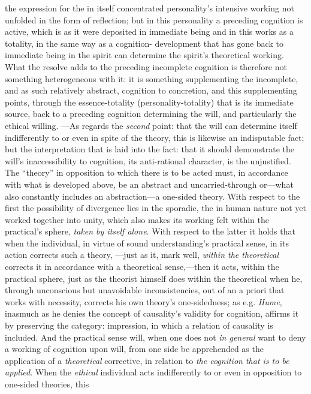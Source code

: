\documentclass[12pt,a4paper]{book}
\begin{document}
the expression for the in itself concentrated personality's intensive working not unfolded in the
form of reflection; but in this personality a preceding cognition is active, which is as it were
deposited in immediate being and in this works as a totality, in the same way as a cognition-
development that has gone back to immediate being in the spirit can determine the spirit's
theoretical working. What the resolve adds to the preceding incomplete cognition is therefore not
something heterogeneous with it: it is something supplementing the incomplete, and as such relatively
abstract, cognition to concretion, and this supplementing points, through the essence-totality
(personality-totality) that is its immediate source, back to a preceding cognition determining the
will, and particularly the ethical willing. ---As regards the \emph{second} point: that the will can
determine itself indifferently to or even in spite of the theory, this is likewise an indisputable
fact; but the interpretation that is laid into the fact: that it should demonstrate the will's
inaccessibility to cognition, its anti-rational character, is the unjustified. The ``theory'' in
opposition to which there is to be acted must, in accordance with what is developed above, be an
abstract and uncarried-through or---what also constantly includes an abstraction---a one-sided
theory. With respect to the first the possibility of divergence lies in the sporadic, the in human
nature not yet worked together into unity, which also makes its working felt within the
practical's sphere, \emph{taken by itself alone}. With respect to the latter it holds that when the
individual, in virtue of sound understanding's practical sense, in its action corrects such a theory,
---just as it, mark well, \emph{within the theoretical} corrects it in accordance with a theoretical
sense,---then it acts, within the practical sphere, just as the theorist himself does within the
theoretical when he, through unconscious but unavoidable inconsistencies, out of an a priori that
works with necessity, corrects his own theory's one-sidedness; as e.g. \emph{Hume}, inasmuch as he denies
the concept of causality's validity for cognition, affirms it by preserving the category: impression,
in which a relation of causality is included. And the practical sense will, when one does not \emph{in
general} want to deny a working of cognition upon will, from one side be apprehended as the application
of a \emph{theoretical} corrective, in relation to \emph{the cognition that is to be applied}.
When the \emph{ethical} individual acts indifferently to or even in opposition to one-sided theories, this
\end{document}
